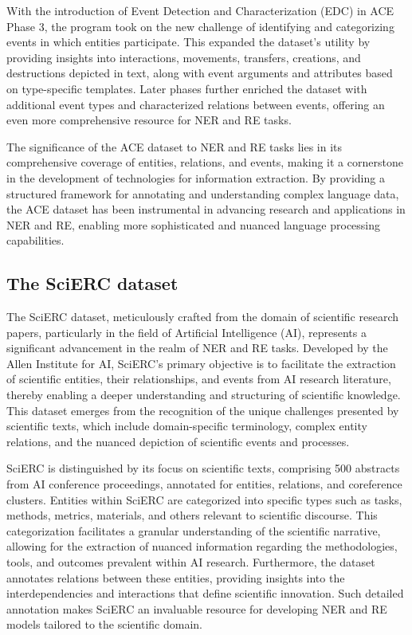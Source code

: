 With the introduction of Event Detection and Characterization (EDC) in ACE Phase 3, the program took on the new challenge of identifying and categorizing events in which entities participate. This expanded the dataset's utility by providing insights into interactions, movements, transfers, creations, and destructions depicted in text, along with event arguments and attributes based on type-specific templates. Later phases further enriched the dataset with additional event types and characterized relations between events, offering an even more comprehensive resource for NER and RE tasks.

The significance of the ACE dataset to NER and RE tasks lies in its comprehensive coverage of entities, relations, and events, making it a cornerstone in the development of technologies for information extraction. By providing a structured framework for annotating and understanding complex language data, the ACE dataset has been instrumental in advancing research and applications in NER and RE, enabling more sophisticated and nuanced language processing capabilities.
\subsection{The SciERC dataset}
\label{sec:sciercdataset}
The SciERC dataset, meticulously crafted from the domain of scientific research papers, particularly in the field of Artificial Intelligence (AI), represents a significant advancement in the realm of NER and RE tasks\cite{luan2018multitask}. Developed by the Allen Institute for AI, SciERC's primary objective is to facilitate the extraction of scientific entities, their relationships, and events from AI research literature, thereby enabling a deeper understanding and structuring of scientific knowledge. This dataset emerges from the recognition of the unique challenges presented by scientific texts, which include domain-specific terminology, complex entity relations, and the nuanced depiction of scientific events and processes.

SciERC is distinguished by its focus on scientific texts, comprising 500 abstracts from AI conference proceedings, annotated for entities, relations, and coreference clusters. Entities within SciERC are categorized into specific types such as tasks, methods, metrics, materials, and others relevant to scientific discourse. This categorization facilitates a granular understanding of the scientific narrative, allowing for the extraction of nuanced information regarding the methodologies, tools, and outcomes prevalent within AI research. Furthermore, the dataset annotates relations between these entities, providing insights into the interdependencies and interactions that define scientific innovation. Such detailed annotation makes SciERC an invaluable resource for developing NER and RE models tailored to the scientific domain.

